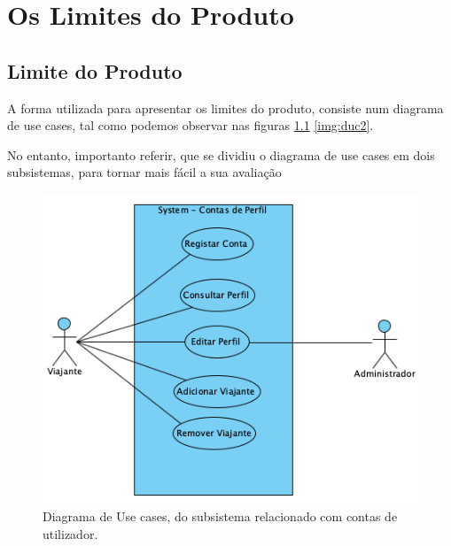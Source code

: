 \chapter{Os Limites do Produto}

\section{Limite do Produto}
\hspace{5mm} A forma utilizada para apresentar os limites do produto, consiste num diagrama de use cases, tal como podemos observar nas figuras \ref{img:duc1} \ref{img:duc2}. 

\hspace{5mm}No entanto, importanto referir, que se dividiu o diagrama de use cases em dois subsistemas, para tornar mais fácil a sua avaliação

\begin{figure}[H]
    \centering
	\includegraphics[scale=0.80]{imagens/diagrama-use-cases-1.png}
	\caption{Diagrama de Use cases, do subsistema relacionado com contas de utilizador.}
	\label{img:duc1}
\end{figure}

